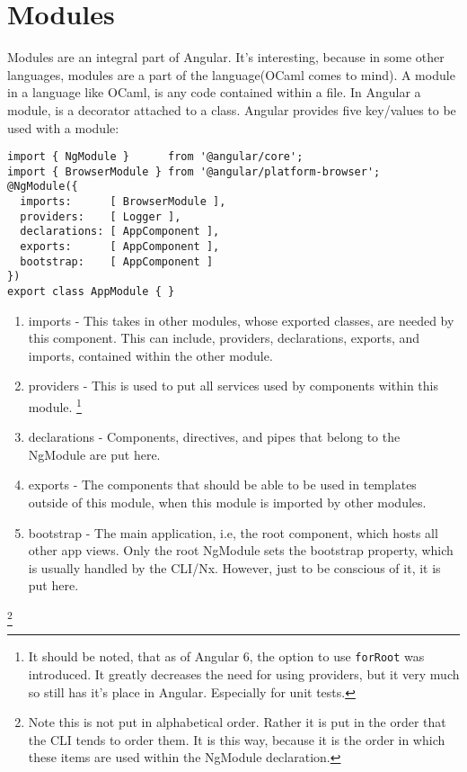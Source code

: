 \section{ Modules }
\maketitle{}

Modules are an integral part of Angular. It's interesting, because in some
other languages, modules are a part of the language(OCaml comes to mind). A
module in a language like OCaml, is any code contained within a file. In Angular
a module, is a decorator attached to a class. Angular provides five key/values
to be used with a module:
\begin{lstlisting}
import { NgModule }      from '@angular/core';
import { BrowserModule } from '@angular/platform-browser';
@NgModule({
  imports:      [ BrowserModule ],
  providers:    [ Logger ],
  declarations: [ AppComponent ],
  exports:      [ AppComponent ],
  bootstrap:    [ AppComponent ]
})
export class AppModule { }
\end{lstlisting}

\begin{enumerate}
  \item imports - This takes in other modules, whose exported classes, are
  needed by this component. This can include, providers, declarations, exports,
  and imports, contained within the other module.
  \item providers - This is used to put all services used by components within
  this module. \footnote{It should be noted, that as of Angular 6, the option
  to use \lstinline{forRoot} was introduced. It greatly decreases the need for
  using providers, but it very much so still has it's place in Angular.
  Especially for unit tests.}
  \item declarations - Components, directives, and pipes that belong to the
  NgModule are put here.
  \item exports - The components that should be able to be used in templates
  outside of this module, when this module is imported by other modules.
  \item bootstrap - The main application, i.e, the root component, which hosts
  all other app views. Only the root NgModule sets the bootstrap property,
  which is usually handled by the CLI/Nx. However, just to be conscious of it,
  it is put here. 
\end{enumerate}
\footnote{Note this is not put in alphabetical order. Rather it is put in the
order that the CLI tends to order them. It is this way, because it is the order
in which these items are used within the NgModule declaration.}
